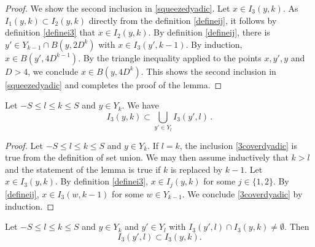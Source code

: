 \begin{proof}
We show the second inclusion in \eqref{squeezedyadic}. Let $x\in I_3(y,k)$. As $I_1(y,k)\subset I_2(y,k)$ directly from the definition \eqref{defineij}, it follows by definition \eqref{definei3} that $x\in I_2(y,k)$. By definition \eqref{defineij}, there is $y'\in Y_{k-1}\cap B(y,2D^k)$ with $x\in I_3(y',k-1)$. By induction, $x\in B(y', 4D^{k-1})$. By the triangle inequality applied to the points $x,y',y$ and $D>4$, we conclude $x\in B(y,4D^k)$. This shows the second inclusion in \eqref{squeezedyadic} and completes the proof of the lemma.
\end{proof}

\begin{lemma}
    \label{cover-by-cubes}
    \leanok
    Let $-S\le l\le k\le S$ and
    $y\in Y_k$.
    We have
    \begin{equation}\label{3coverdyadic}
    I_3(y,k)\subset \bigcup_{y'\in Y_l} I_3(y',l)\, .
    \end{equation}
\end{lemma}
\begin{proof}
    \leanok
    Let $-S\le l\le k\le S$ and $y\in Y_k$.
    If $l=k$, the inclusion \eqref{3coverdyadic}
    is true from the definition of set union.
    We may then assume inductively that $k>l$ and the statement of the lemma is true if $k$ is replaced by $k-1$.
    Let $x\in I_3(y,k)$.
    By definition \eqref{definei3}, $x\in I_j(y,k)$
    for some $j\in \{1,2\}$. By \eqref{defineij},
    $x\in I_3(w,k-1)$ for some $w\in Y_{k-1}$.
    We conclude \eqref{3coverdyadic} by induction.
\end{proof}

\begin{lemma}
    \label{dyadic-property}
    \leanok
    Let $-S\le l\le k\le S$ and $y\in Y_k$ and $y'\in Y_l$ with
    $I_3(y',l)\cap I_3(y,k)\neq \emptyset$. Then
    \begin{equation}
        \label{3dyadicproperty}
    I_3(y',l)\subset I_3(y,k).
    \end{equation}
\end{lemma}

